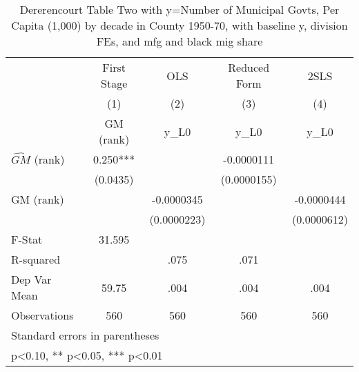 \begin{table}[htbp]\centering
\def\sym#1{\ifmmode^{#1}\else\(^{#1}\)\fi}
\caption{Dererencourt Table Two with y=Number of Municipal Govts, Per Capita (1,000) by decade in County 1950-70, with baseline y, division FEs, and mfg and black mig share}
\begin{tabular}{l*{4}{c}}
\toprule
                    & First Stage   &         OLS   &Reduced Form   &        2SLS   \\
                    &\multicolumn{1}{c}{(1)}&\multicolumn{1}{c}{(2)}&\multicolumn{1}{c}{(3)}&\multicolumn{1}{c}{(4)}\\
                    &\multicolumn{1}{c}{GM  (rank)}&\multicolumn{1}{c}{y\_L0}&\multicolumn{1}{c}{y\_L0}&\multicolumn{1}{c}{y\_L0}\\
\midrule
$\hat{GM}$ (rank)   &       0.250***&               &  -0.0000111   &               \\
                    &    (0.0435)   &               & (0.0000155)   &               \\
\addlinespace
GM  (rank)          &               &  -0.0000345   &               &  -0.0000444   \\
                    &               & (0.0000223)   &               & (0.0000612)   \\
\midrule
F-Stat              &      31.595   &               &               &               \\
R-squared           &               &        .075   &        .071   &               \\
Dep Var Mean        &       59.75   &        .004   &        .004   &        .004   \\
Observations        &         560   &         560   &         560   &         560   \\
\bottomrule
\multicolumn{5}{l}{\footnotesize Standard errors in parentheses}\\
\multicolumn{5}{l}{\footnotesize * p<0.10, ** p<0.05, *** p<0.01}\\
\end{tabular}
\end{table}
